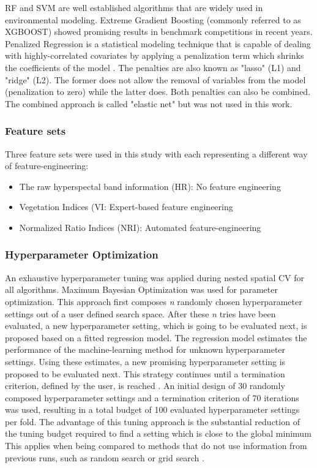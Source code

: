 \documentclass[review]{elsarticle}
\begin{document}
\noindent \ac{RF} and {SVM} are well established algorithms that are widely used in environmental modeling.
Extreme Gradient Boosting (commonly referred to as \ac{XGBOOST}) showed promising results in benchmark competitions in recent years.
Penalized Regression is a statistical modeling technique that is capable of dealing with highly-correlated covariates by applying a penalization term which shrinks the coefficients of the model \citep{hastie2001}.
The penalties are also known as "lasso" (L1) and "ridge" (L2).
The former does not allow the removal of variables from the model (penalization to zero) while the latter does.
Both penalties can also be combined.
The combined approach is called "elastic net" but was not used in this work.

\subsubsection{Feature sets}

\noindent Three feature sets were used in this study with each representing a different way of feature-engineering:

\begin{itemize}
	\item The raw hyperspectal band information (HR): No feature engineering
	\item Vegetation Indices (\ac{VI}: Expert-based feature engineering
	\item Normalized Ratio Indices (\ac{NRI}): Automated feature-engineering
\end{itemize}

\subsubsection{Hyperparameter Optimization}

\noindent An exhaustive hyperparameter tuning was applied during nested spatial \ac{CV} for all algorithms.
Maximum Bayesian Optimization \citep{mlrmbo} was used for parameter optimization.
This approach first composes \textit{n} randomly chosen hyperparameter settings out of a user defined search space.
After these \textit{n} tries have been evaluated, a new hyperparameter setting, which is going to be evaluated next, is proposed based on a fitted regression model.
The regression model estimates the performance of the machine-learning method for unknown hyperparameter settings.
Using these estimates, a new promising hyperparameter setting is proposed to be evaluated next.
This strategy continues until a termination criterion, defined by the user, is reached \citep{hutter2011, jones1998}.
An initial design of 30 randomly composed hyperparameter settings and a termination criterion of 70 iterations was used, resulting in a total budget of 100 evaluated hyperparameter settings per fold.
The advantage of this tuning approach is the substantial reduction of the tuning budget required to find a setting which is close to the global minimum
This applies when being compared to methods that do not use information from previous runs, such as random search or grid search \citep{bergstra2012}.
\end{document}
